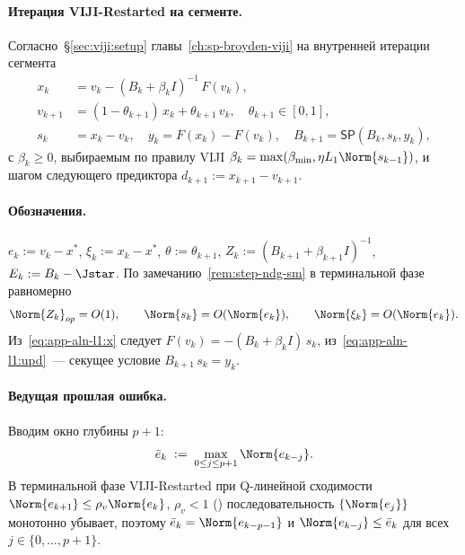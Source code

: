 \paragraph{Итерация VIJI-Restarted на сегменте.}
Согласно~\S\ref{sec:viji:setup} главы~\ref{ch:sp-broyden-viji} на внутренней
итерации сегмента
\begin{align}
x_k     &= v_k - (B_k + \beta_k I)^{-1}\, F(v_k), \label{eq:app-aln-l1:x}\\
v_{k+1} &= (1 - \theta_{k+1})\, x_k + \theta_{k+1}\, v_k,
\quad \theta_{k+1} \in [0,1], \label{eq:app-aln-l1:v}\\
s_k     &= x_k - v_k, \quad y_k = F(x_k) - F(v_k),
\quad B_{k+1} = \mathsf{SP}(B_k, s_k, y_k), \label{eq:app-aln-l1:upd}
\end{align}
с $\beta_k \ge 0$, выбираемым по правилу VIJI
$\beta_k = \max(\beta_{\min}, \eta L_1\Norm{s_{k-1}})$, и шагом следующего
предиктора $d_{k+1} := x_{k+1} - v_{k+1}$.

\paragraph{Обозначения.}
$e_k := v_k - x^{*}$, $\xi_k := x_k - x^{*}$, $\theta := \theta_{k+1}$,
$Z_k := (B_{k+1} + \beta_{k+1} I)^{-1}$, $E_k := B_k - \Jstar$. По
замечанию~\ref{rem:step-ndg-sm} в терминальной фазе равномерно
\begin{equation}
\Norm{Z_k}_{op} = O(1),
\qquad
\Norm{s_k} = O(\Norm{e_k}),
\qquad
\Norm{\xi_k} = O(\Norm{e_k}).
\label{eq:app-aln-l1:basic-bounds}
\end{equation}
Из~\eqref{eq:app-aln-l1:x} следует $F(v_k) = -(B_k + \beta_k I)\,s_k$,
из~\eqref{eq:app-aln-l1:upd}~--- секущее условие $B_{k+1}\,s_k = y_k$.

\paragraph{Ведущая прошлая ошибка.}
Вводим окно глубины $p+1$:
\begin{equation}
\bar e_k \;:=\; \max_{0 \le j \le p+1}\Norm{e_{k-j}}.
\label{eq:app-aln-l1:bar-e}
\end{equation}
В терминальной фазе VIJI-Restarted при Q-линейной сходимости
$\Norm{e_{k+1}} \le \rho_v\Norm{e_k}$, $\rho_v < 1$
\textup{(}\cite[Theorem~3.4]{Agafonov2024VIJI}\textup{)} последовательность
$\{\Norm{e_j}\}$ монотонно убывает, поэтому $\bar e_k = \Norm{e_{k-p-1}}$
и $\Norm{e_{k-j}} \le \bar e_k$ для всех $j \in \{0,\ldots,p+1\}$.

